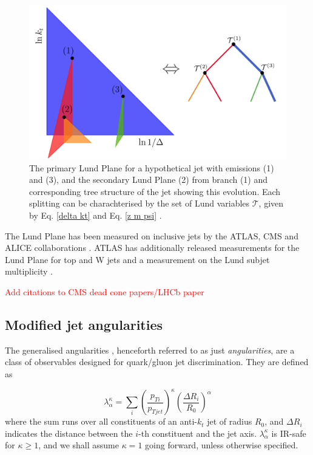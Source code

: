 \documentclass[10pt,a4paper]{book}
\newcommand{\todo}[1]{{\textcolor{red}{#1}}}
\begin{document}
\begin{figure}
\centering
\includegraphics[width=0.7\linewidth]{emissions}
\caption{The primary Lund Plane for a hypothetical jet with emissions (1) and (3), and the secondary Lund Plane (2) from branch (1) and corresponding tree structure of the jet showing this evolution. Each splitting can be charachterised by the set of Lund variables $\mathcal{T}$, given by Eq. \ref{delta kt} and Eq. \ref{z m psi} \cite{Dreyer:2020brq}.}
\label{emissions}
\end{figure}

The Lund Plane has been measured on inclusive jets by the ATLAS, CMS and ALICE collaborations \cite{ATLAS:2020bbn, CMS:2023lpp, ALICE:2021yet}. ATLAS has additionally released measurements for the Lund Plane for top and W jets \cite{ATLAS:2024dua} and a measurement on the Lund subjet multiplicity \cite{ATLAS:2024wrd}.

\todo{Add citations to CMS dead cone papers/LHCb paper}


 
\subsection{Modified jet angularities}

The generalised angularities \cite{Larkoski:2014pca, Proceedings:2018jsb, Gras:2017jty}, henceforth referred to as just \emph{angularities}, are a class of observables designed for quark/gluon jet discrimination. They are defined as 

\begin{equation}
\lambda^\kappa_\alpha = \sum_i \left(\frac{p_{Ti}}{p_{Tjet}}\right)^\kappa \left(\frac{\Delta R_i}{R_0} \right)^\alpha
\end{equation} 
where the sum runs over all constituents of an anti-$k_t$ jet of radius $R_0$, and $\Delta R_i$ indicates the distance between the $i$-th constituent and the jet axis. $\lambda^\kappa_\alpha$ is IR-safe for $\kappa \geq 1$, and we shall assume $\kappa = 1$ going forward, unless otherwise specified.
\end{document}
